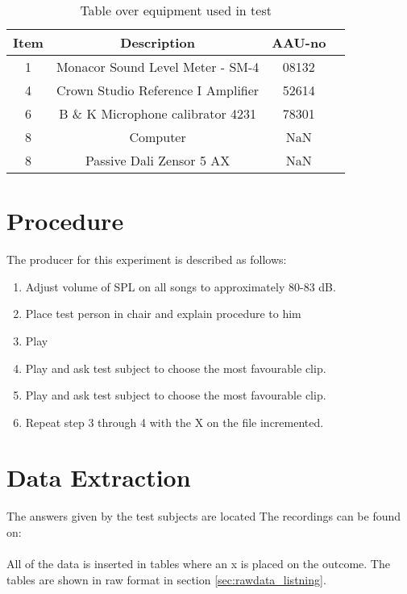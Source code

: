 \begin{table}[H]
\centering
{}
\begin{tabular}{S[table-format=1]ccc} \toprule
    {Item} & {Description} & {AAU-no} \\       &  Monacor Sound Level Meter - SM-4      & 08132   \\
    4      &  Crown Studio Reference I Amplifier    & 52614   \\
    6      &  B \& K Microphone calibrator 4231     & 78301   \\
    8      &  Computer                              & NaN     \\  
    8      &  Passive Dali Zensor 5 AX              & NaN     \\ \bottomrule 
\end{tabular}
\caption{Table over equipment used in test}
\label{tab:UsedEquipmentListning}
\end{table}



\section{Procedure}\label{sec:SpeakerTestProcedure3}

The producer for this experiment is described as follows:
\vspace*{-5mm}
\begin{enumerate}\addtolength{\itemsep}{-.35\baselineskip} 
\item Adjust volume of \gls{SPL} on all songs to approximately 80-83 dB.
\item Place test person in chair and explain procedure to him
\item Play 
\item Play  and ask test subject to choose the most favourable clip.
\item Play  and ask test subject to choose the most favourable clip.
\item Repeat step 3 through 4 with the X on the file incremented.
\end{enumerate}

\section{Data Extraction}
The answers given by the test subjects are located
The recordings can be found on:\\
\\
All of the data is inserted in tables where an x is placed on the outcome. The tables are shown in raw format in section \ref{sec:rawdata_listning}.



